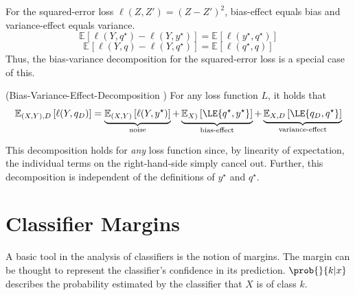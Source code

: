 \documentclass[
    a4paper, %
	fontsize=10pt, %
	twoside=false, %
]{kaobook}
\begin{document}
\begin{titlepage}
For the squared-error loss $\ell(Z, Z') = (Z - Z')^2$, bias-effect equals bias and variance-effect equals variance.
$$
 \mathbb{E}_{}\left[ \ell(Y, q^\star) - \ell(Y, y^\star) \right]  = \mathbb{E}_{}\left[ \ell(y^\star, q^\star) \right]
$$
$$
 \mathbb{E}_{}\left[ \ell(Y,q) - \ell(Y, q^\star) \right]  = \mathbb{E}_{}\left[ \ell(q^\star, q)  \right] 
$$
Thus, the bias-variance decomposition for the squared-error loss is a special case of this.


\begin{theorem} (Bias-Variance-Effect-Decomposition \cite{james_GeneralizationsBiasVariance_})
\label{thm:bias-variance-effect}
For any loss function $L$, it holds that
\begin{align*}
\mathbb{E}_{(X,Y), D}\left[ \ell(Y, q_{D}) \right]  
&= 
\underbrace{\mathbb{E}_{(X,Y)}\left[ \ell(Y, y^\star) \right]  }_{\text{noise}}
+ \underbrace{\mathbb{E}_{X)}\left[ \LE{q^\star, y^\star} \right] }_{\text{bias-effect}}
+ \underbrace{\mathbb{E}_{X,D}\left[ \LE{q_D, q^\star} \right] }_{\text{variance-effect}}  \\
\end{align*}
\end{theorem}
This decomposition holds for \textit{any} loss function since, by linearity of expectation, the individual terms on the right-hand-side simply cancel out. Further, this decomposition is independent of the definitions of $y^\star$ and $q^\star$.


\section{Classifier Margins}

A basic tool in the analysis of classifiers is the notion of margins.  The margin can be thought to represent the classifier's confidence in its prediction. $\prob{}{k|x}$ describes the probability estimated by the classifier that $X$ is of class $k$.


\end{titlepage}
\end{document}
